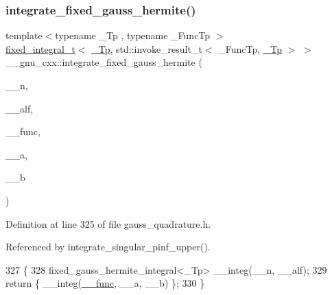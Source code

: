 \subsubsection{\texorpdfstring{integrate\+\_\+fixed\+\_\+gauss\+\_\+hermite()}{integrate\_fixed\_gauss\_hermite()}}
{\footnotesize\ttfamily template$<$typename \+\_\+\+Tp , typename \+\_\+\+Func\+Tp $>$ \\
\hyperlink{struct____gnu__cxx_1_1fixed__integral__t}{fixed\+\_\+integral\+\_\+t}$<$ \hyperlink{namespace____gnu__cxx_a3b19a9c800ca194374ef9172290f7d79}{\+\_\+\+Tp}, std\+::invoke\+\_\+result\+\_\+t$<$ \+\_\+\+Func\+Tp, \hyperlink{namespace____gnu__cxx_a3b19a9c800ca194374ef9172290f7d79}{\+\_\+\+Tp} $>$ $>$ \+\_\+\+\_\+gnu\+\_\+cxx\+::integrate\+\_\+fixed\+\_\+gauss\+\_\+hermite (\begin{DoxyParamCaption}\item[{int}]{\+\_\+\+\_\+n,  }\item[{\hyperlink{namespace____gnu__cxx_a3b19a9c800ca194374ef9172290f7d79}{\+\_\+\+Tp}}]{\+\_\+\+\_\+alf,  }\item[{\+\_\+\+Func\+Tp}]{\+\_\+\+\_\+func,  }\item[{\hyperlink{namespace____gnu__cxx_a3b19a9c800ca194374ef9172290f7d79}{\+\_\+\+Tp}}]{\+\_\+\+\_\+a,  }\item[{\hyperlink{namespace____gnu__cxx_a3b19a9c800ca194374ef9172290f7d79}{\+\_\+\+Tp}}]{\+\_\+\+\_\+b }\end{DoxyParamCaption})}



Definition at line 325 of file gauss\+\_\+quadrature.\+h.



Referenced by integrate\+\_\+singular\+\_\+pinf\+\_\+upper().


\begin{DoxyCode}
327     \{
328       fixed\_gauss\_hermite\_integral<\_Tp> \_\_integ(\_\_n, \_\_alf);
329       \textcolor{keywordflow}{return} \{ \_\_integ(\hyperlink{namespace____gnu__cxx_af2b2f0c7a2ae72b922b1afefae5a65b2}{\_\_func}, \_\_a, \_\_b) \};
330     \}
\end{DoxyCode}
\mbox{\label{namespace____gnu__cxx_a798b6524ce81200fec2e9e1712fcdd35}} 
